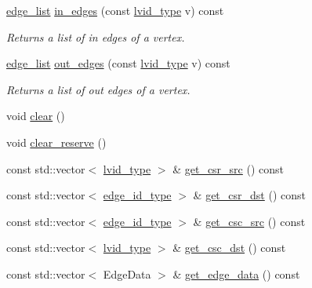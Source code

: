 \begin{DoxyCompactItemize}
\hyperlink{classsaedb_1_1graph__storage_1_1edge__list}{edge\-\_\-list} \hyperlink{classsaedb_1_1graph__storage_abb1d835d0df4be3301673f6c2c5bfc90}{in\-\_\-edges} (const \hyperlink{classsaedb_1_1graph__storage_a147a907accd64bb1f803a423d04dd04b}{lvid\-\_\-type} v) const 
\begin{DoxyCompactList}\small\item\em Returns a list of in edges of a vertex. \end{DoxyCompactList}\item 
\hyperlink{classsaedb_1_1graph__storage_1_1edge__list}{edge\-\_\-list} \hyperlink{classsaedb_1_1graph__storage_ac9b8f8b1158f1833fdff4c00cdbc5e24}{out\-\_\-edges} (const \hyperlink{classsaedb_1_1graph__storage_a147a907accd64bb1f803a423d04dd04b}{lvid\-\_\-type} v) const 
\begin{DoxyCompactList}\small\item\em Returns a list of out edges of a vertex. \end{DoxyCompactList}\item 
void \hyperlink{classsaedb_1_1graph__storage_a34f5c99769ff8e6d1a622b0da90d7259}{clear} ()
\item 
void \hyperlink{classsaedb_1_1graph__storage_aee29afe8c3b346e0187067bc0aafdf3a}{clear\-\_\-reserve} ()
\item 
const std\-::vector$<$ \hyperlink{classsaedb_1_1graph__storage_a147a907accd64bb1f803a423d04dd04b}{lvid\-\_\-type} $>$ \& \hyperlink{classsaedb_1_1graph__storage_af321af2bc94a4e055c46fc0f96aebe15}{get\-\_\-csr\-\_\-src} () const 
\item 
const std\-::vector$<$ \hyperlink{classsaedb_1_1graph__storage_a7861f26a1e724120e58d9feba4da37a1}{edge\-\_\-id\-\_\-type} $>$ \& \hyperlink{classsaedb_1_1graph__storage_a59ed44c9835c661fda5ee918b970c1b8}{get\-\_\-csr\-\_\-dst} () const 
\item 
const std\-::vector$<$ \hyperlink{classsaedb_1_1graph__storage_a7861f26a1e724120e58d9feba4da37a1}{edge\-\_\-id\-\_\-type} $>$ \& \hyperlink{classsaedb_1_1graph__storage_aba0663444785b9404a67647029cf227e}{get\-\_\-csc\-\_\-src} () const 
\item 
const std\-::vector$<$ \hyperlink{classsaedb_1_1graph__storage_a147a907accd64bb1f803a423d04dd04b}{lvid\-\_\-type} $>$ \& \hyperlink{classsaedb_1_1graph__storage_a1c99607641bcade569be4edc7b281022}{get\-\_\-csc\-\_\-dst} () const 
\item 
const std\-::vector$<$ Edge\-Data $>$ \& \hyperlink{classsaedb_1_1graph__storage_a719f1a35301e5923e1307b99f0ce3187}{get\-\_\-edge\-\_\-data} () const 

\end{DoxyCompactItemize}
